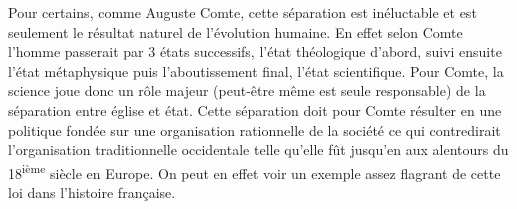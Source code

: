 
Pour certains, comme Auguste Comte, cette séparation est inéluctable
et est seulement le résultat naturel de l'évolution humaine. En effet
selon Comte l'homme passerait par 3 états successifs, l'état
théologique d'abord, suivi ensuite l'état métaphysique puis
l'aboutissement final, l'état scientifique. Pour Comte, la science
joue donc un rôle majeur (peut-être même est seule responsable) de la
séparation entre église et état. Cette séparation doit pour Comte
résulter en une politique fondée sur une organisation rationnelle de
la société ce qui contredirait l'organisation traditionnelle
occidentale telle qu'elle fût jusqu'en aux alentours du
18\textsuperscript{ième} siècle en Europe. On peut en effet voir un
exemple assez flagrant de cette loi dans l'histoire française.
